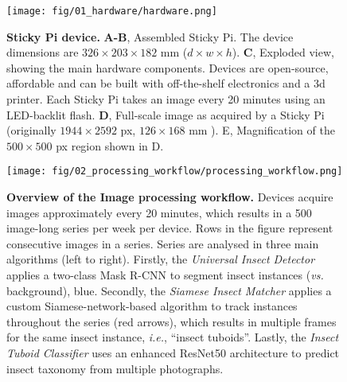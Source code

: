 \documentclass[12pt]{article}
\begin{document}
	
	
	\pagebreak
	\begin{figure}[ht]
		\centering
		\texttt{[image: fig/01\_hardware/hardware.png]}
		\caption{\textbf{Sticky Pi device.} \textbf{A-B}, Assembled Sticky Pi. The device dimensions are $326 \times{} 203 \times{} 182$ mm ($d \times{} w \times{} h$). \textbf{C}, Exploded view, showing the main hardware components. Devices are open-source, affordable and can be built with off-the-shelf electronics and a 3d printer. Each Sticky Pi takes an image every 20 minutes using an LED-backlit flash. \textbf{D}, Full-scale image as acquired by a Sticky Pi (originally $1944 \times{} 2592$ px, $126 \times{} 168$ mm ). E, Magnification of the $500 \times{} 500$ px region shown in D.}
		\label{fig:01}
	\end{figure}
	\pagebreak

	\begin{figure}[ht]
		\centering
		\texttt{[image: fig/02\_processing\_workflow/processing\_workflow.png]}
		\caption{\textbf{Overview of the Image processing workflow.} Devices acquire images approximately every 20 minutes, which results in a 500 image-long series per week per device. Rows in the figure represent consecutive images in a series. Series are analysed in three main algorithms (left to right). Firstly, the \emph{Universal Insect Detector} applies a two-class Mask R-CNN to segment insect instances (\emph{vs.} background), blue. Secondly, the \emph{Siamese Insect Matcher} applies a custom Siamese-network-based algorithm to track instances throughout the series (red arrows), which results in multiple frames for the same insect instance, \emph{i.e.}, “insect tuboids”. Lastly, the \emph{Insect Tuboid Classifier} uses an enhanced ResNet50 architecture to predict insect taxonomy from multiple photographs.}
		\label{fig:02}
	\end{figure}

	\pagebreak
\end{document}
